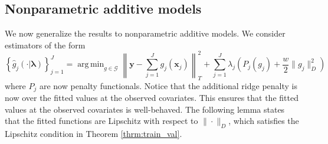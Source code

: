 \documentclass[12pt]{article}
\newtheorem{lemma}{Lemma}
\newtheorem{definition}{Definition}
\newtheorem{condition}{Condition}
\DeclareMathOperator*{\argmin}{arg\,min}
\begin{document}
%
%
%


\subsection{Nonparametric additive models}
\label{sec:smoothness_validation}

We now generalize the results to nonparametric additive models. We consider estimators of the form
\begin{equation}
\label{eq:train_crit_ridge}
\left\{ \hat{g}_j(\cdot | \boldsymbol \lambda) \right \}_{j=1}^J = \argmin_{g\in \mathcal{G}} \left \| \boldsymbol y -  \sum_{j=1}^J g_j(\boldsymbol x_j) \right \|^2_T + \sum_{j=1}^J \lambda_j \left ( P_j(g_j) + \frac{w}{2} \| g_j \|^2_D \right )
\end{equation}
where $P_j$ are now penalty functionals. Notice that the additional ridge penalty is now over the fitted values at the observed covariates. This ensures that the fitted values at the observed covariates is well-behaved. The following lemma states that the fitted functions are Lipschitz with respect to $\| \cdot \|_D$, which satisfies the Lipschitz condition in Theorem \ref{thrm:train_val}.
\end{document}
